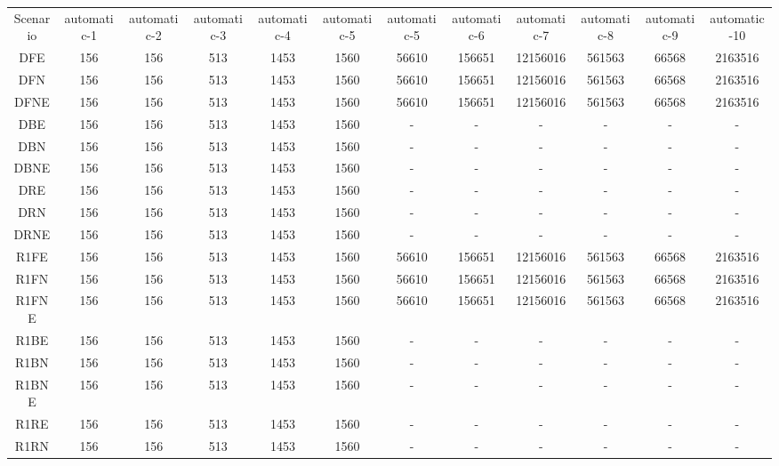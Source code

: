 \documentclass [11pt]{article}
\begin{document}
\begin{sidewaystable}
  \scriptsize
  \everyrow{\hline}
  \begin{tabu} {| c |c | c |c |c |c |c |c |c |c |c |c |}
  Scenario  &automatic-1 & automatic-2  &automatic-3  &automatic-4  & automatic-5&  automatic-5 & automatic-6  & automatic-7  &  automatic-8 & automatic-9 & automatic-10 \\
  DFE  & 156 & 156  & 513  & 1453 &  1560 &  56610 & 156651  & 12156016  &  561563 & 66568 & 2163516 \\ 
  DFN  & 156 & 156  & 513  & 1453 &  1560 &  56610 & 156651  & 12156016  &  561563 & 66568 & 2163516 \\ 
  DFNE  & 156 & 156  & 513  & 1453 &  1560 &  56610 & 156651  & 12156016  &  561563 & 66568 & 2163516 \\ 
  DBE  & 156 & 156  & 513  & 1453 &  1560 &  - &   -  &   -  &    - &   - &   - \\ 
  DBN  & 156 & 156  & 513  & 1453 &  1560 &  - &   -  &   -  &    - &   - &   - \\ 
  DBNE  & 156 & 156  & 513  & 1453 &  1560 &  - &   -  &   -  &    - &   - &   - \\ 
  DRE  & 156 & 156  & 513  & 1453 &  1560 &  - &   -  &   -  &    - &   - &   - \\ 
  DRN  & 156 & 156  & 513  & 1453 &  1560 &  - &   -  &   -  &    - &   - &   - \\ 
  DRNE  & 156 & 156  & 513  & 1453 &  1560 &  - &   -  &   -  &    - &   - &   - \\ 
  R1FE  & 156 & 156  & 513  & 1453 &  1560 &  56610 & 156651  & 12156016  &  561563 & 66568 & 2163516 \\ 
  R1FN  & 156 & 156  & 513  & 1453 &  1560 &  56610 & 156651  & 12156016  &  561563 & 66568 & 2163516 \\ 
  R1FNE  & 156 & 156  & 513  & 1453 &  1560 &  56610 & 156651  & 12156016  &  561563 & 66568 & 2163516 \\ 
  R1BE  & 156 & 156  & 513  & 1453 &  1560 &  - &   -  &   -  &    - &   - &   - \\ 
  R1BN  & 156 & 156  & 513  & 1453 &  1560 &  - &   -  &   -  &    - &   - &   - \\ 
  R1BNE  & 156 & 156  & 513  & 1453 &  1560 &  - &   -  &   -  &    - &   - &   - \\ 
  R1RE  & 156 & 156  & 513  & 1453 &  1560 &  - &   -  &   -  &    - &   - &   - \\ 
  R1RN  & 156 & 156  & 513  & 1453 &  1560 &  - &   -  &   -  &    - &   - &   - \\ 

\end{tabu}
\end{sidewaystable}
\end{document}
